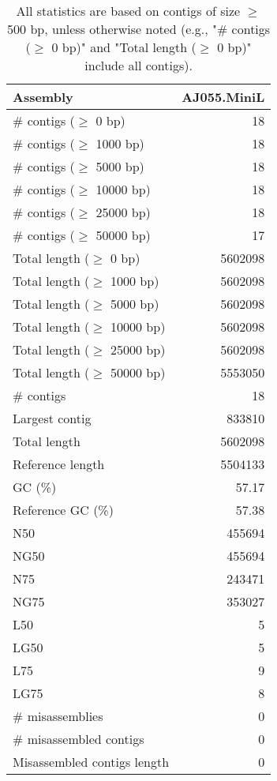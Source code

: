 \documentclass[12pt,a4paper]{article}
\begin{document}
\begin{table}[ht]
\begin{center}
\caption{All statistics are based on contigs of size $\geq$ 500 bp, unless otherwise noted (e.g., "\# contigs ($\geq$ 0 bp)" and "Total length ($\geq$ 0 bp)" include all contigs).}
\begin{tabular}{|l*{1}{|r}|}
\hline
Assembly & AJ055.MiniL \\ \hline
\# contigs ($\geq$ 0 bp) & 18 \\ \hline
\# contigs ($\geq$ 1000 bp) & 18 \\ \hline
\# contigs ($\geq$ 5000 bp) & 18 \\ \hline
\# contigs ($\geq$ 10000 bp) & 18 \\ \hline
\# contigs ($\geq$ 25000 bp) & 18 \\ \hline
\# contigs ($\geq$ 50000 bp) & 17 \\ \hline
Total length ($\geq$ 0 bp) & 5602098 \\ \hline
Total length ($\geq$ 1000 bp) & 5602098 \\ \hline
Total length ($\geq$ 5000 bp) & 5602098 \\ \hline
Total length ($\geq$ 10000 bp) & 5602098 \\ \hline
Total length ($\geq$ 25000 bp) & 5602098 \\ \hline
Total length ($\geq$ 50000 bp) & 5553050 \\ \hline
\# contigs & 18 \\ \hline
Largest contig & 833810 \\ \hline
Total length & 5602098 \\ \hline
Reference length & 5504133 \\ \hline
GC (\%) & 57.17 \\ \hline
Reference GC (\%) & 57.38 \\ \hline
N50 & 455694 \\ \hline
NG50 & 455694 \\ \hline
N75 & 243471 \\ \hline
NG75 & 353027 \\ \hline
L50 & 5 \\ \hline
LG50 & 5 \\ \hline
L75 & 9 \\ \hline
LG75 & 8 \\ \hline
\# misassemblies & 0 \\ \hline
\# misassembled contigs & 0 \\ \hline
Misassembled contigs length & 0 \\ \hline

\end{tabular}
\end{center}
\end{table}
\end{document}
